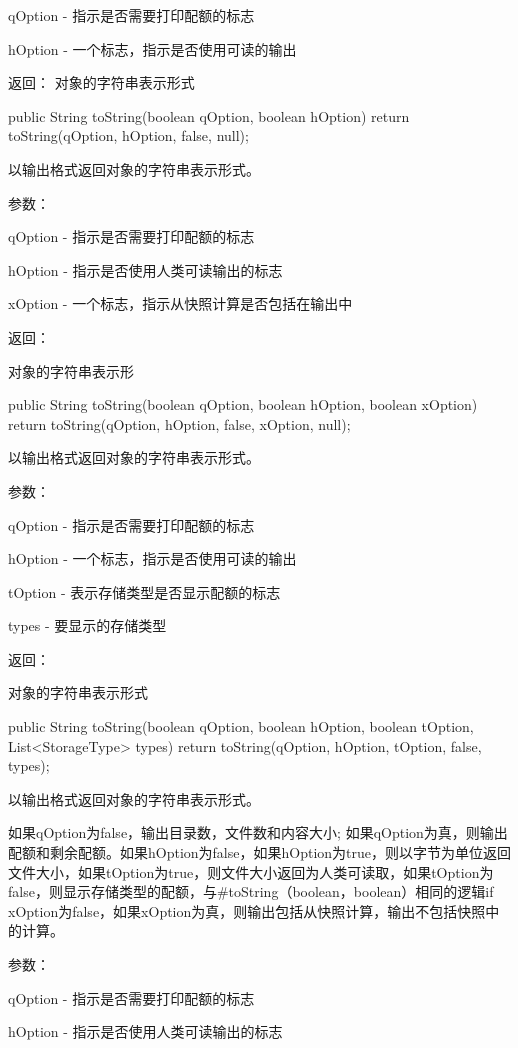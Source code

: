 \begin{java}
qOption - 指示是否需要打印配额的标志

hOption - 一个标志，指示是否使用可读的输出


返回：
对象的字符串表示形式
\begin{java}
public String toString(boolean qOption, boolean hOption) {
  return toString(qOption, hOption, false, null);
}
\end{java}
以输出格式返回对象的字符串表示形式。

参数：

qOption - 指示是否需要打印配额的标志

hOption - 指示是否使用人类可读输出的标志

xOption - 一个标志，指示从快照计算是否包括在输出中

返回：

对象的字符串表示形
\begin{java}
public String toString(boolean qOption, boolean hOption, boolean xOption) {
  return toString(qOption, hOption, false, xOption, null);
}
\end{java}
以输出格式返回对象的字符串表示形式。

参数：

qOption - 指示是否需要打印配额的标志

hOption - 一个标志，指示是否使用可读的输出

tOption - 表示存储类型是否显示配额的标志

types - 要显示的存储类型

返回：

对象的字符串表示形式

\begin{java}
public String toString(boolean qOption, boolean hOption,
                       boolean tOption, List<StorageType> types) {
  return toString(qOption, hOption, tOption, false, types);
}
\end{java}
以输出格式返回对象的字符串表示形式。

如果qOption为false，输出目录数，文件数和内容大小; 如果qOption为真，则输出配额和剩余配额。如果hOption为false，如果hOption为true，则以字节为单位返回文件大小，如果tOption为true，则文件大小返回为人类可读取，如果tOption为false，则显示存储类型的配额，与#toString（boolean，boolean）相同的逻辑if xOption为false，如果xOption为真，则输出包括从快照计算，输出不包括快照中的计算。

参数：

qOption - 指示是否需要打印配额的标志

hOption - 指示是否使用人类可读输出的标志


\end{java}
